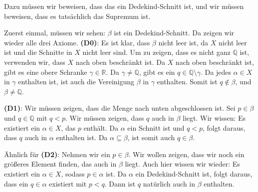 \begin{spoken-clean}[01:15:30 - 01:18:15 continued]
Dazu müssen wir beweisen, dass das ein Dedekind-Schnitt ist, und wir müssen beweisen, dass es tatsächlich das Supremum ist.

Zuerst einmal, müssen wir sehen: $\beta$ ist ein Dedekind-Schnitt. Da zeigen wir wieder alle drei Axiome. \textbf{(D0)}: Es ist klar, dass $\beta$ nicht leer ist, da $X$ nicht leer ist und die Schnitte in $X$ nicht leer sind. Um zu zeigen, dass es nicht ganz $\mathbb{Q}$ ist, verwenden wir, dass $X$ nach oben beschränkt ist. Da $X$ nach oben beschränkt ist, gibt es eine obere Schranke $\gamma \in \mathbb{R}$. Da $\gamma \neq \mathbb{Q}$, gibt es ein $q \in \mathbb{Q} \setminus \gamma$. Da jedes $\alpha \in X$ in $\gamma$ enthalten ist, ist auch die Vereinigung $\beta$ in $\gamma$ enthalten. Somit ist $q \notin \beta$, und $\beta \neq \mathbb{Q}$.

\textbf{(D1)}: Wir müssen zeigen, dass die Menge nach unten abgeschlossen ist. Sei $p \in \beta$ und $q \in \mathbb{Q}$ mit $q < p$. Wir müssen zeigen, dass $q$ auch in $\beta$ liegt. Wir wissen: Es existiert ein $\alpha \in X$, das $p$ enthält. Da $\alpha$ ein Schnitt ist und $q < p$, folgt daraus, dass $q$ auch in $\alpha$ enthalten ist. Da $\alpha \subseteq \beta$, ist somit auch $q \in \beta$.

Ähnlich für \textbf{(D2)}: Nehmen wir ein $p \in \beta$. Wir wollen zeigen, dass wir noch ein größeres Element finden, das auch in $\beta$ liegt. Auch hier wissen wir wieder: Es existiert ein $\alpha \in X$, sodass $p \in \alpha$ ist. Da $\alpha$ ein Dedekind-Schnitt ist, folgt daraus, dass ein $q \in \alpha$ existiert mit $p < q$. Dann ist $q$ natürlich auch in $\beta$ enthalten.
\end{spoken-clean}


